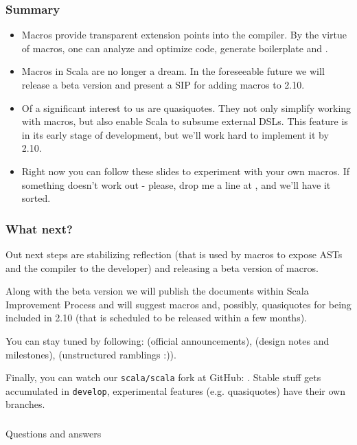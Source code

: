 \documentclass[hyperref={bookmarks=false}]{beamer}
\begin{document}
\begin{frame}[t,fragile]
\frametitle{Summary}
\begin{itemize}
\item Macros provide transparent extension points into the compiler. By the virtue of macros, one can analyze and optimize code, generate boilerplate and .
\item Macros in Scala are no longer a dream. In the foreseeable future we will release a beta version and present a SIP for adding macros to 2.10.
\item Of a significant interest to us are quasiquotes. They not only simplify working with macros, but also enable Scala to subsume external DSLs. This feature is in its early stage of development, but we'll work hard to implement it by 2.10.
\item Right now you can follow these slides to experiment with your own macros. If something doesn't work out - please, drop me a line at , and we'll have it sorted.
\end{itemize}
\end{frame}

\begin{frame}[t,fragile]
\frametitle{What next?}

Out next steps are stabilizing reflection (that is used by macros to expose ASTs and the compiler to the developer) and releasing a beta version of macros.

Along with the beta version we will publish the documents within Scala Improvement Process and will suggest macros and, possibly, quasiquotes for being included in 2.10 (that is scheduled to be released within a few months).

You can stay tuned by following:  (official announcements),  (design notes and milestones),  (unstructured ramblings :)).

Finally, you can watch our \texttt{scala/scala} fork at GitHub: . Stable stuff gets accumulated in \texttt{develop}, experimental features (e.g. quasiquotes) have their own branches.
\end{frame}

\begin{frame}[c, fragile]
\frametitle{}

\centering
{\Large Questions and answers}\\

\centering
{}

\end{frame}
\end{document}
